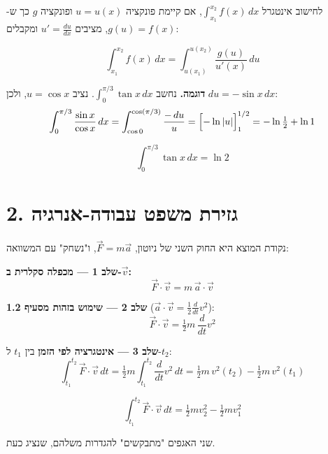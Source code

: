 \documentclass[12pt, a4paper]{article}
\newcommand{\hvec}[1]{\overrightarrow{#1}}
\begin{document}
לחישוב אינטגרל \textenglish{$\int_{x_1}^{x_2} f(x)\,dx$}, אם קיימת פונקציה \textenglish{$u = u(x)$} ופונקציה \textenglish{$g$} כך ש-\textenglish{$g(u) = f(x)$}, מציבים \textenglish{$u' = \tfrac{du}{dx}$} ומקבלים:

\begin{tcolorbox}[notebox, title={החלפת משתנה}]
\[
  \int_{x_1}^{x_2} f(x)\,dx
  = \int_{u(x_1)}^{u(x_2)} \frac{g(u)}{u'(x)}\,du
\]
\end{tcolorbox}

\textbf{דוגמה.} נחשב \textenglish{$\displaystyle\int_0^{\pi/3}\tan x\,dx$}. נציב \textenglish{$u = \cos x$}, ולכן \textenglish{$du = -\sin x\,dx$}:
\[
  \int_0^{\pi/3}\frac{\sin x}{\cos x}\,dx
  = \int_{\cos 0}^{\cos(\pi/3)} \frac{-\,du}{u}
  = \Bigl[-\ln|u|\Bigr]_{1}^{1/2}
  = -\ln\tfrac{1}{2} + \ln 1
\]

\begin{tcolorbox}[resultbox]
\[
  \int_0^{\pi/3}\tan x\,dx = \ln 2
\]
\end{tcolorbox}

\section*{2. גזירת משפט עבודה-אנרגיה}

נקודת המוצא היא החוק השני של ניוטון, \textenglish{$\hvec{F} = m\hvec{a}$}, ו"נשחק" עם המשוואה:

\textbf{שלב 1 --- מכפלה סקלרית ב-\textenglish{$\hvec{v}$}:}
\[
  \hvec{F}\cdot\hvec{v} = m\,\hvec{a}\cdot\hvec{v}
\]

\textbf{שלב 2 --- שימוש בזהות מסעיף 1.2} (\textenglish{$\hvec{a}\cdot\hvec{v} = \tfrac12\frac{d}{dt}v^2$}):
\[
  \hvec{F}\cdot\hvec{v} = \tfrac{1}{2}m\,\frac{d}{dt}v^2
\]

\textbf{שלב 3 --- אינטגרציה לפי הזמן} בין \textenglish{$t_1$} ל-\textenglish{$t_2$}:
\[
  \int_{t_1}^{t_2}\hvec{F}\cdot\hvec{v}\,dt
  = \tfrac{1}{2}m\int_{t_1}^{t_2}\frac{d}{dt}v^2\,dt
  = \tfrac{1}{2}m\,v^2(t_2) - \tfrac{1}{2}m\,v^2(t_1)
\]

\begin{tcolorbox}[resultbox]
\[
  \int_{t_1}^{t_2}\hvec{F}\cdot\hvec{v}\,dt
  = \tfrac{1}{2}m v_2^2 - \tfrac{1}{2}m v_1^2
\]
\end{tcolorbox}

שני האגפים "מתבקשים" להגדרות משלהם, שנציג כעת.

\end{document}
